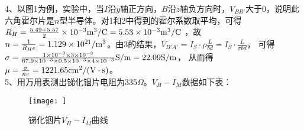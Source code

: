 \documentclass[UTF8]{ctexart}
\begin{document}
4、以图1为例，实验中，当$I$沿$y$轴正方向，$B$沿$z$轴负方向时，$V_{BB'}$大于0，说明此六角霍尔片是$n$型半导体。对1和2中得到的霍尔系数取平均，可得$R_{H}=\frac{5.49+5.57}{2}\times 10^{-3}\rm{m^3/C}=5.53\times 10^{-3}\rm{m^3/C}$
，故$n=\frac{1}{R_{H}e}=1.129\times 10^{21}/\rm{m^{3}}$。由3的结果，$V_{B'A'}=I_{S}\cdot \rho \frac{L}{bd}=I_{S}\cdot\frac{L}{\sigma bd}$，
可得$\sigma =\frac{1\times 10^{-3}\times 3\times 10^{-3}}{67.9\times 10^{-3}\times 0.5\times 10^{-3}\times 4\times 10^{-3}}\rm{S/m}=22.09\rm{S/m}$，
从而得$\mu=\frac{\sigma}{ne}=1221.65\rm{cm^{2}/(V\cdot s)}$。~\\
5、用万用表测出锑化铟片电阻为335$\Omega$。$V_{H}-I_{M}$数据如下表：
\begin{table}[H]
    \centering
    \end{table}
    \begin{figure}[H]
        \centering
        \texttt{[image: ]}
\caption{锑化铟片$V_{H}-I_{M}$曲线}
\end{figure}
~\\
\end{document}
